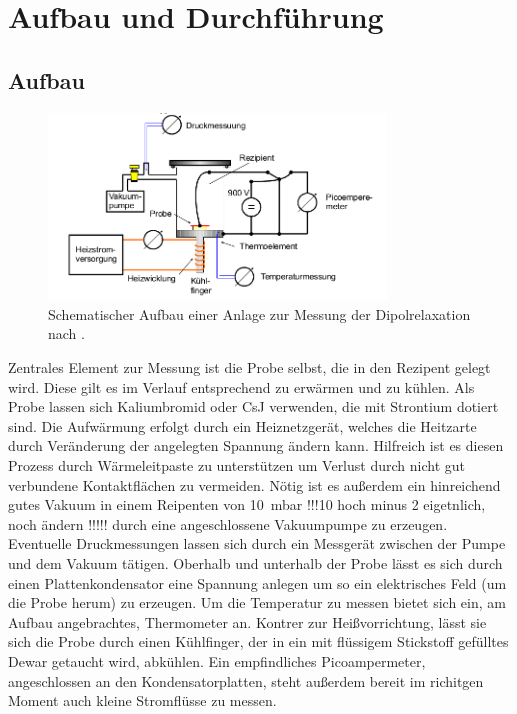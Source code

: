 \section{Aufbau und Durchführung}
\subsection{Aufbau}
\begin{figure}
    \centering
    \includegraphics[width=0.8\textwidth]{bilder/Aufbau.png}
    \caption{Schematischer Aufbau einer Anlage zur Messung der Dipolrelaxation nach
            \cite{skript}.}
    \label{fig:aufbau}
\end{figure}

Zentrales Element zur Messung ist die Probe selbst, die in den Rezipent gelegt wird. Diese gilt es im Verlauf entsprechend
zu erwärmen und zu kühlen. Als Probe lassen sich Kaliumbromid oder CsJ verwenden, die mit Strontium
dotiert sind. Die Aufwärmung erfolgt durch ein Heiznetzgerät, welches die Heitzarte durch Veränderung der angelegten Spannung ändern kann.
Hilfreich ist es diesen Prozess durch Wärmeleitpaste zu unterstützen um
Verlust durch nicht gut verbundene Kontaktflächen zu vermeiden.
Nötig ist es außerdem ein hinreichend gutes Vakuum in einem Reipenten von \SI{10}{\milli\bar} !!!10 hoch minus 2 eigetnlich, noch ändern !!!!! 
durch eine angeschlossene Vakuumpumpe zu erzeugen.
Eventuelle Druckmessungen  lassen sich durch ein Messgerät zwischen der Pumpe und dem Vakuum tätigen.
Oberhalb und unterhalb der Probe lässt es sich durch einen Plattenkondensator eine Spannung anlegen um so ein 
elektrisches Feld (um die Probe herum) zu erzeugen. Um die Temperatur zu messen bietet sich ein, am Aufbau angebrachtes, Thermometer an.
Kontrer zur Heißvorrichtung, lässt sie sich die Probe durch einen Kühlfinger, der in ein mit flüssigem Stickstoff gefülltes Dewar getaucht wird, 
abkühlen.
Ein empfindliches Picoampermeter, angeschlossen an den Kondensatorplatten, steht außerdem bereit im richitgen Moment auch kleine
Stromflüsse zu messen.

